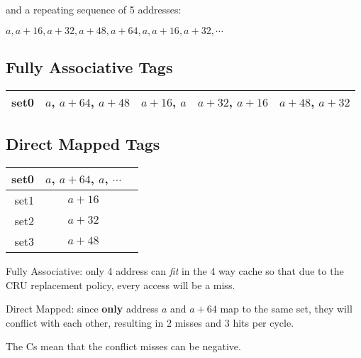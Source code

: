 \documentclass[a4paper,12pt]{article}
\begin{document}
and a repeating sequence of 5 addresses:

$a, a + 16, a + 32, a + 48, a + 64, a, a + 16, a + 32, \cdots$

\subsection*{Fully Associative Tags}

\begin{tabular}{r|c|c|c|c|}
\hline
set0&\sout{$a$}, $a+64$, $a+48$&\sout{$a+16$}, $a$&\sout{$a+32$},
$a+16$&$a+48$, $a+32$\\
\hline
\end{tabular}

\subsection*{Direct Mapped Tags}

\begin{tabular}{r|c|l}
\hline
set0	&	\sout{$a$}, $a+64$, $a$, $\cdots$	&	\\	
\hline
set1	&	$a+16$									&	\\	
\hline
set2	&	$a+32$									&	\\	
\hline
set3	&	$a+48$									&	\\	
\hline
\end{tabular}

Fully Associative: only 4 address can \emph{fit} in the 4 way cache so
that due to the CRU replacement policy, every access will be a miss.

Direct Mapped: since \textbf{only} address $a$ and $a + 64$ map to the
same set, they will conflict with each other, resulting in 2 misses and
3 hits per cycle.

The Cs mean that the conflict misses can be negative.
\end{document}
